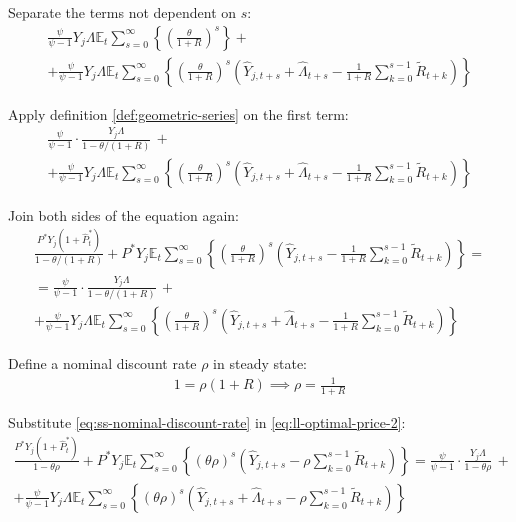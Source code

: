 \documentclass[
	12pt,
	]{article}
\numberwithin{equation}{section}
\newcommand{\E}[1][t]{{\mathbb{E}_{#1}}}
\theoremstyle{definition}
\theoremstyle{plain}
\theoremstyle{plain}
\theoremstyle{plain}
\begin{document}
Separate the terms not dependent on $s$:
\begin{multline}
	\frac{\psi}{\psi-1} Y_{j} \Lambda \E \sum_{s=0}^{\infty} \left\{ \left( \frac{\theta}{1 + R} \right)^s \right\} + 
\\
	+ \frac{\psi}{\psi-1} Y_{j} \Lambda \E \sum_{s=0}^{\infty} \left\{ \left( \frac{\theta}{1 + R} \right)^s \left( \hat{Y}_{j,t+s} + \hat{\Lambda}_{t+s} - \frac{1}{1 + R} \sum_{k=0}^{s-1} \widetilde{R}_{t+k} \right) \right\} \nonumber
\end{multline}

Apply definition \ref{def:geometric-series} on the first term:
\begin{multline}
	\frac{\psi}{\psi-1} \cdot \frac{Y_{j} \Lambda}{1-\theta /(1+R)} \, + 
	\\
	+ \frac{\psi}{\psi-1} Y_{j} \Lambda \E \sum_{s=0}^{\infty} \left\{ \left( \frac{\theta}{1 + R} \right)^s \left( \hat{Y}_{j,t+s} + \hat{\Lambda}_{t+s} - \frac{1}{1 + R} \sum_{k=0}^{s-1} \widetilde{R}_{t+k} \right) \right\} \nonumber
\end{multline}

Join both sides of the equation again:
\begin{multline}
	\frac{ P^\ast Y_{j} ( 1 + \hat{P}_t^\ast ) }{1-\theta /(1+R)} + P^\ast Y_{j} \E \sum_{s=0}^{\infty} \left\{ \left( \frac{\theta}{1 + R} \right)^s \left( \hat{Y}_{j,t+s} - \frac{1}{1 + R} \sum_{k=0}^{s-1} \widetilde{R}_{t+k} \right) \right\} = 
\\
	= \frac{\psi}{\psi-1} \cdot \frac{Y_{j} \Lambda}{1-\theta /(1+R)} \, + 
\\
	+ \frac{\psi}{\psi-1} Y_{j} \Lambda \E \sum_{s=0}^{\infty} \left\{ \left( \frac{\theta}{1 + R} \right)^s \left( \hat{Y}_{j,t+s} + \hat{\Lambda}_{t+s} - \frac{1}{1 + R} \sum_{k=0}^{s-1} \widetilde{R}_{t+k} \right) \right\} \label{eq:ll-optimal-price-2}
\end{multline}

Define a nominal discount rate $\rho$ in steady state:
\begin{align}
	1 = \rho (1 + R) \implies \rho = \frac{1}{1 + R} \label{eq:ss-nominal-discount-rate}
\end{align}

Substitute \ref{eq:ss-nominal-discount-rate} in \ref{eq:ll-optimal-price-2}:
\begin{multline}
	\frac{ P^\ast Y_{j} ( 1 + \hat{P}_t^\ast ) }{1- \theta \rho} + P^\ast Y_{j} \E \sum_{s=0}^{\infty} \left\{ \left( \theta \rho \right)^s \left( \hat{Y}_{j,t+s} - \rho \sum_{k=0}^{s-1} \widetilde{R}_{t+k} \right) \right\} = \frac{\psi}{\psi-1} \cdot \frac{Y_{j} \Lambda}{1- \theta \rho } \, + 
\\ 
	+ \frac{\psi}{\psi-1} Y_{j} \Lambda \E \sum_{s=0}^{\infty} \left\{ \left( \theta \rho \right)^s \left( \hat{Y}_{j,t+s} + \hat{\Lambda}_{t+s} - \rho \sum_{k=0}^{s-1} \widetilde{R}_{t+k} \right) \right\} \label{eq:ll-optimal-price-3}
\end{multline}
\end{document}
